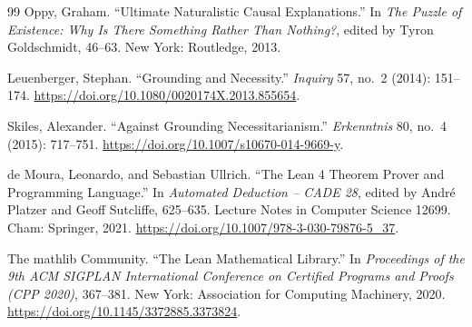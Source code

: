 \documentclass[11pt,letterpaper]{article}
\theoremstyle{plain}
\theoremstyle{definition}
\begin{document}
\begin{thebibliography}{99}
Oppy, Graham. ``Ultimate Naturalistic Causal Explanations.'' In \emph{The Puzzle of Existence: Why Is There Something Rather Than Nothing?}, edited by Tyron Goldschmidt, 46--63. New York: Routledge, 2013.

Leuenberger, Stephan. ``Grounding and Necessity.'' \emph{Inquiry} 57, no.~2 (2014): 151--174. \url{https://doi.org/10.1080/0020174X.2013.855654}.

Skiles, Alexander. ``Against Grounding Necessitarianism.'' \emph{Erkenntnis} 80, no.~4 (2015): 717--751. \url{https://doi.org/10.1007/s10670-014-9669-y}.

de Moura, Leonardo, and Sebastian Ullrich. ``The Lean 4 Theorem Prover and Programming Language.'' In \emph{Automated Deduction -- CADE 28}, edited by André Platzer and Geoff Sutcliffe, 625--635. Lecture Notes in Computer Science 12699. Cham: Springer, 2021. \url{https://doi.org/10.1007/978-3-030-79876-5_37}.

The mathlib Community. ``The Lean Mathematical Library.'' In \emph{Proceedings of the 9th ACM SIGPLAN International Conference on Certified Programs and Proofs (CPP 2020)}, 367--381. New York: Association for Computing Machinery, 2020. \url{https://doi.org/10.1145/3372885.3373824}.

\end{thebibliography}
\end{document}
